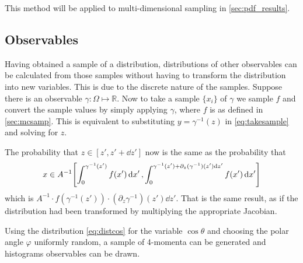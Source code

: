 This method will be applied to multi-dimensional sampling in
\cref{sec:pdf_results}.

\subsection{Observables}%
\label{sec:obs}

Having obtained a sample of a distribution, distributions of other
observables can be calculated from those samples without having to
transform the distribution into new variables. This is due to the
discrete nature of the samples. Suppose there is an observable
\(\gamma\colon\Omega\mapsto\mathbb{R}\). Now to take a sample
\(\{x_i\}\) of \(\gamma\) we sample \(f\) and convert the sample
values by simply applying \(\gamma\), where \(f\) is as defined in
\cref{sec:mcsamp}. This is equivalent to substituting
\(y=\gamma^{-1}(z)\) in \cref{eq:takesample} and solving for \(z\).

The probability that \(z\in[z', z'+\dd{z'}]\) now is the same as the
probability that
\[\displaystyle x\in
  A^{-1}\qty[\int_{0}^{\gamma^{-1}(z')}f(x')\dd{x'},
  \int_{0}^{\gamma^{-1}(z')+\partial_z(\gamma^{-1})(z')\dd{z'}}f(x')\dd{x'}]\]
which is
\(A^{-1}\cdot f(\gamma^{-1}(z'))\cdot
(\partial_z\gamma^{-1})(z')\dd{z'}\). That is the same result, as if
the distribution had been transformed by multiplying the appropriate
Jacobian.

Using the distribution \cref{eq:distcos} for the variable
\(\cos\theta\) and choosing the polar angle \(\varphi\) uniformly
random, a sample of 4-momenta can be generated and histograms
observables can be drawn.

